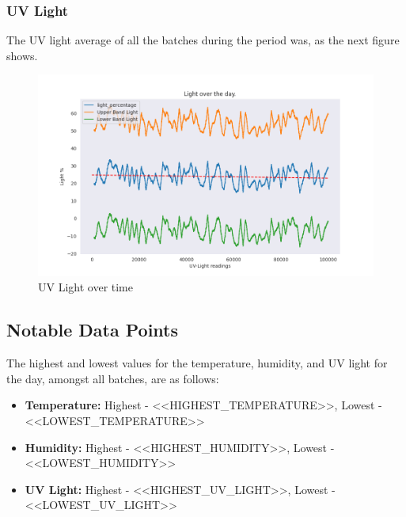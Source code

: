 \documentclass[daily]{engenius}
\begin{document}

\subsubsection{UV Light}

The UV light average of all the batches during the period was, as the next figure shows.

\begin{figure}[!ht]
    \begin{center}
        \includegraphics[width=\textwidth/2]{./temp/light_plot.png}
        \caption{UV Light over time}
        \label{img:engeniuslogo}
    \end{center}
\end{figure}


\subsection{Notable Data Points}

The highest and lowest values for the temperature, humidity, and UV light for the day, amongst all batches, are as follows:

\begin{itemize}
    \item \textbf{Temperature:} Highest - {<<HIGHEST_TEMPERATURE>>}, Lowest - {<<LOWEST_TEMPERATURE>>}
    \item \textbf{Humidity:} Highest - {<<HIGHEST_HUMIDITY>>}, Lowest - {<<LOWEST_HUMIDITY>>}
    \item \textbf{UV Light:} Highest - {<<HIGHEST_UV_LIGHT>>}, Lowest - {<<LOWEST_UV_LIGHT>>}
\end{itemize}
\end{document}
